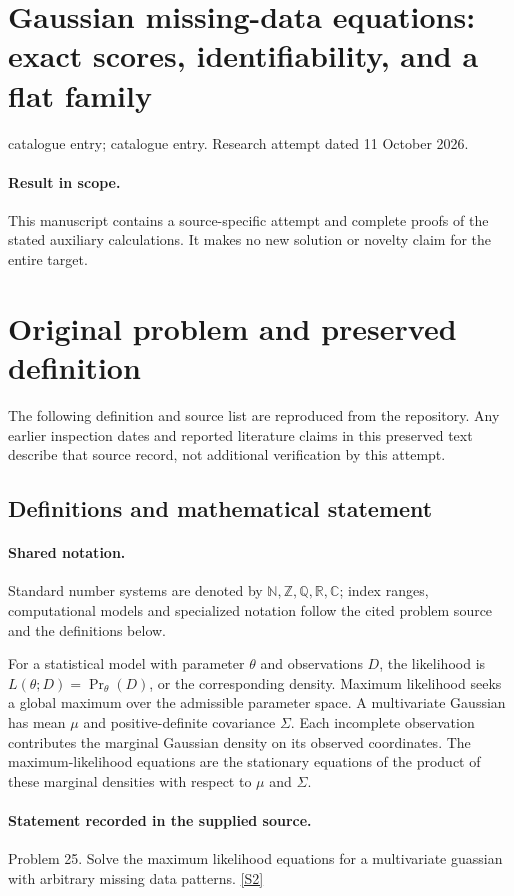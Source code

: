 \documentclass[11pt]{article}
\begin{document}
\section*{Gaussian missing-data equations: exact scores, identifiability, and a flat family}
\noindent catalogue entry; catalogue entry. Research attempt dated 11 October 2026.
\paragraph{Result in scope.}This manuscript contains a source-specific attempt and complete proofs of the stated auxiliary calculations. It makes no new solution or novelty claim for the entire target.
\section{Original problem and preserved definition}
The following definition and source list are reproduced from the repository. Any earlier inspection dates and reported literature claims in this preserved text describe that source record, not additional verification by this attempt.
\subsection{Definitions and mathematical statement}

\paragraph{Shared notation.}Standard number systems are denoted by $\mathbb N,\mathbb Z,\mathbb Q,\mathbb R,\mathbb C$; index ranges, computational models and specialized notation follow the cited problem source and the definitions below.


For a statistical model with parameter $\theta$ and observations $D$, the likelihood is $L(\theta;D)=\Pr_\theta(D)$, or the corresponding density. Maximum likelihood seeks a global maximum over the admissible parameter space. A multivariate Gaussian has mean $\mu$ and positive-definite covariance $\Sigma$. Each incomplete observation contributes the marginal Gaussian density on its observed coordinates. The maximum-likelihood equations are the stationary equations of the product of these marginal densities with respect to $\mu$ and $\Sigma$.
\paragraph{Statement recorded in the supplied source.}
Problem 25. Solve the maximum likelihood equations for a multivariate guassian with arbitrary missing data patterns. \href{https://aimath.org/WWN/compalgstat/compalgstat.pdf}{[S2]}
\end{document}
